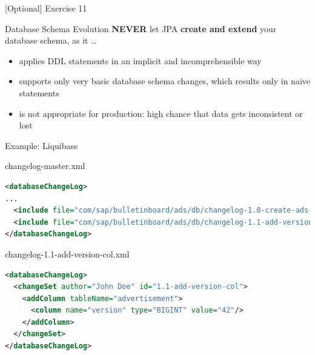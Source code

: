\begin{frame}{[Optional] Exercise 11}
\end{frame}

\begin{frame}{Database Schema Evolution}
\textbf{NEVER} let JPA \textbf{create and extend} your database schema, as it \ldots
\begin{itemize}
\item applies DDL statements in an implicit and incomprehensible way
\item supports only very basic database schema changes, which results only in naive  statements
\item is not appropriate for production: high chance that data gets inconsistent or lost
\end{itemize}
\vfill
{}
\vfill
{}
\end{frame}

\begin{frame}[fragile]{Example: Liquibase}
\scriptsize
\begin{block}{changelog-master.xml}
\begin{lstlisting}[language=XML,belowskip=0mm,aboveskip=0mm]
<databaseChangeLog>
...
  <include file="com/sap/bulletinboard/ads/db/changelog-1.0-create-ads-table.xml"/> 
  <include file="com/sap/bulletinboard/ads/db/changelog-1.1-add-version-col.xml"/>  
</databaseChangeLog> 
\end{lstlisting}
\end{block}
\vfill
\begin{block}{changelog-1.1-add-version-col.xml}
\begin{lstlisting}[language=XML,belowskip=0mm,aboveskip=0mm]
<databaseChangeLog>
  <changeSet author="John Doe" id="1.1-add-version-col">
    <addColumn tableName="advertisement">
      <column name="version" type="BIGINT" value="42"/>
    </addColumn>
  </changeSet>
</databaseChangeLog>
\end{lstlisting}
\end{block}
\small
{}
\\
\end{frame}

